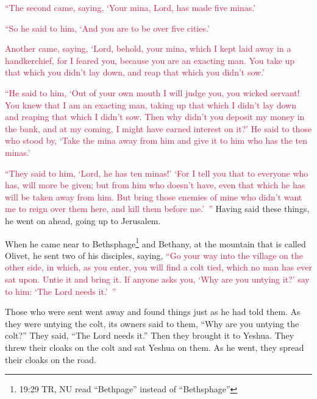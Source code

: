 \myverse{}\textcolor{crimson}{“The second came, saying, ‘Your mina, Lord, has made five
	minas.’
}

\myverse{}\textcolor{crimson}{“So he said to him, ‘And you are to be over five cities.’
}

\myverse{}\textcolor{crimson}{Another came, saying, ‘Lord, behold, your mina, which I
	kept laid away in a handkerchief,
}
\myverse{}\textcolor{crimson}{for I feared you, because you are an exacting man. You take up that which
	you didn’t lay down, and reap that which you didn’t sow.’}

\myverse{}\textcolor{crimson}{“He said to him, ‘Out of your own mouth I will judge you,
	you wicked servant! You knew that I am an exacting man, taking up that which I didn’t lay down and reaping
	that which I didn’t sow.
}
\myverse{}\textcolor{crimson}{Then why didn’t you deposit my money in the bank, and at my coming, I
	might have earned interest on it?’
}
\myverse{}\textcolor{crimson}{He said to those who stood by, ‘Take the mina away from him and give
	it to him who has the ten minas.’}

\myverse{}\textcolor{crimson}{“They said to him, ‘Lord, he has ten minas!’
}
\myverse{}\textcolor{crimson}{‘For I tell you that to everyone who has, will more be given; but from
	him who doesn’t have, even that which he has will be taken away from him.
}
\myverse{}\textcolor{crimson}{But bring those enemies of mine who didn’t want me to reign over them
	here, and kill them before me.’ ”}
\myverse{}Having said these things, he went on ahead, going up to Jerusalem.

\myverse{}When he came near to Bethsphage\footnote{19:29 TR, NU read “Bethpage” instead of “Bethsphage”} and Bethany, at the mountain that is
called Olivet, he sent two of his disciples,
\myverse{}saying,
\textcolor{crimson}{“Go your way into the village on the other side, in which, as you enter, you will find a colt tied,
	which no man has ever sat upon. Untie it and bring it.
}
\myverse{}\textcolor{crimson}{If anyone asks you, ‘Why are you untying it?’ say to him: ‘The Lord needs
	it.’ ”}

\myverse{}Those who were sent went away and found things just as he had
told them.
\myverse{}As they were untying the colt, its owners said to them, “Why are you untying
the colt?”
\myverse{}They said, “The Lord needs it.”
\myverse{}Then they brought it to Yeshua. They threw their cloaks on the colt and sat
Yeshua on them.
\myverse{}As he went, they spread their cloaks on the road.

